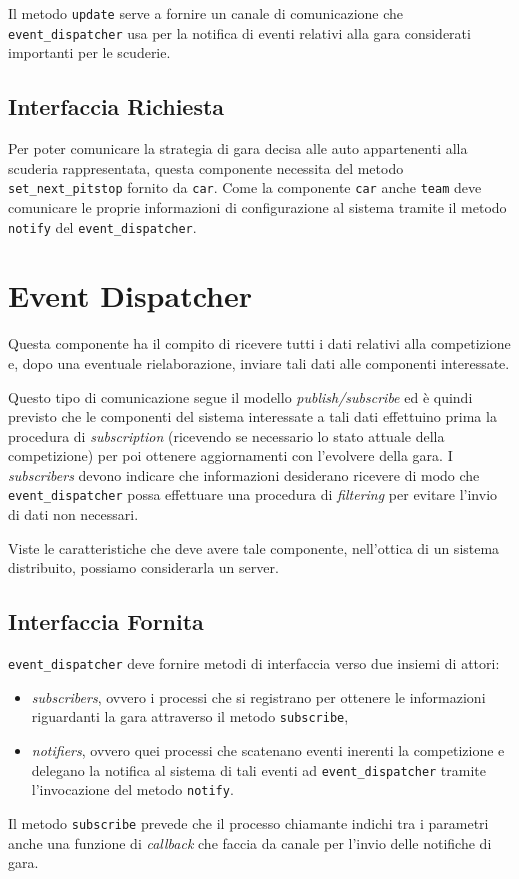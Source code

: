 \documentclass[11pt,a4paper]{report}
\newcommand{\fun}[1]{\texttt{#1}}
\begin{document}
Il metodo \fun{update} serve a fornire un canale di comunicazione che \texttt{event\_dispatcher} usa per la notifica di eventi relativi alla gara considerati importanti per le scuderie.

\subsection*{Interfaccia Richiesta}
Per poter comunicare la strategia di gara decisa alle auto appartenenti alla scuderia rappresentata, questa componente necessita del metodo \fun{set\_next\_pitstop} fornito da \texttt{car}.
Come la componente \texttt{car} anche \texttt{team} deve comunicare le proprie informazioni di configurazione al sistema tramite il metodo \fun{notify} del \texttt{event\_dispatcher}.

\section{Event Dispatcher}
Questa componente ha il compito di ricevere tutti i dati relativi alla competizione e, dopo una eventuale rielaborazione, inviare tali dati alle componenti interessate.

Questo tipo di comunicazione segue il modello \textit{publish/subscribe} ed è quindi previsto che le componenti del sistema interessate a tali dati effettuino prima la procedura di \textit{subscription} (ricevendo se necessario lo stato attuale della competizione) per poi ottenere aggiornamenti con l'evolvere della gara. I \textit{subscribers} devono indicare che informazioni desiderano ricevere di modo che \texttt{event\_dispatcher} possa effettuare una procedura di \textit{filtering} per evitare l'invio di dati non necessari.

Viste le caratteristiche che deve avere tale componente, nell'ottica di un sistema distribuito, possiamo considerarla un server.

\subsection*{Interfaccia Fornita}
\texttt{event\_dispatcher} deve fornire metodi di interfaccia verso due insiemi di attori:
\begin{itemize}
\item \textit{subscribers}, ovvero i processi che si registrano per ottenere le informazioni riguardanti la gara attraverso il metodo \fun{subscribe},
\item \textit{notifiers}, ovvero quei processi che scatenano eventi inerenti la competizione e delegano la notifica al sistema di tali eventi ad \texttt{event\_dispatcher} tramite l'invocazione del metodo \fun{notify}.
\end{itemize}
Il metodo \fun{subscribe} prevede che il processo chiamante indichi tra i parametri anche una funzione di \textit{callback} che faccia da canale per l'invio delle notifiche di gara.
\end{document}
